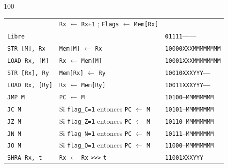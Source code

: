 \documentclass[aspectratio=169]{beamer}
\begin{document}
\begin{frame}[fragile,t]
\begin{textblock}{100}
\begin{tabular}{l|l|l}
                           & \texttt{Rx} $\leftarrow$ \texttt{Rx+1} ; \texttt{Flags} $\leftarrow$ \texttt{Mem[Rx]} & \\
    \texttt{Libre}         &                                                                    & \texttt{\textcolor{r}{01111}\textcolor{gray}{-----------}} \\  %
    \hline
    \texttt{STR  [M], Rx}  & \texttt{Mem[M]} $\leftarrow$ \texttt{Rx}                           & \texttt{\textcolor{r}{10000}\textcolor{v}{XXX}\textcolor{a}{MMMMMMMM}} \\  %
    \texttt{LOAD Rx, [M]}  & \texttt{Rx} $\leftarrow$ \texttt{Mem[M]}                           & \texttt{\textcolor{r}{10001}\textcolor{v}{XXX}\textcolor{a}{MMMMMMMM}} \\  %
    \texttt{STR  [Rx], Ry} & \texttt{Mem[Rx]} $\leftarrow$ \texttt{Ry}                          & \texttt{\textcolor{r}{10010}\textcolor{v}{XXX}\textcolor{verde}{YYY}\textcolor{gray}{-----}} \\  %
    \texttt{LOAD Rx, [Ry]} & \texttt{Rx} $\leftarrow$ \texttt{Mem[Ry]}                          & \texttt{\textcolor{r}{10011}\textcolor{v}{XXX}\textcolor{verde}{YYY}\textcolor{gray}{-----}} \\  %
    \hline
    \texttt{JMP M}         & \texttt{PC} $\leftarrow$ \texttt{M}                                & \texttt{\textcolor{r}{10100}\textcolor{gray}{---}\textcolor{a}{MMMMMMMM}} \\  %
    \texttt{JC M}          & Si \texttt{flag\_C=1} entonces \texttt{PC} $\leftarrow$ \texttt{M} & \texttt{\textcolor{r}{10101}\textcolor{gray}{---}\textcolor{a}{MMMMMMMM}} \\  %
    \texttt{JZ M}          & Si \texttt{flag\_Z=1} entonces \texttt{PC} $\leftarrow$ \texttt{M} & \texttt{\textcolor{r}{10110}\textcolor{gray}{---}\textcolor{a}{MMMMMMMM}} \\  %
    \texttt{JN M}          & Si \texttt{flag\_N=1} entonces \texttt{PC} $\leftarrow$ \texttt{M} & \texttt{\textcolor{r}{10111}\textcolor{gray}{---}\textcolor{a}{MMMMMMMM}} \\  %
    \texttt{JO M}          & Si \texttt{flag\_O=1} entonces \texttt{PC} $\leftarrow$ \texttt{M} & \texttt{\textcolor{r}{11000}\textcolor{gray}{---}\textcolor{a}{MMMMMMMM}} \\  %
    \hline
    \texttt{SHRA Rx, t}    & \texttt{Rx} $\leftarrow$ \texttt{Rx} \verb|>>>| \texttt{t}         & \texttt{\textcolor{r}{11001}\textcolor{v}{XXX}\textcolor{verde}{YYY}\textcolor{gray}{-----}} \\  %

\end{tabular}
\end{textblock}
\end{frame}
\end{document}
